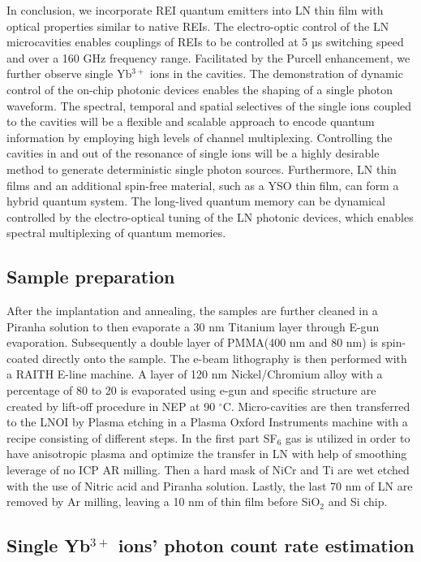 \documentclass[prl,reprint,superscriptaddress]{revtex4-1}
\begin{document}
In conclusion, we incorporate REI quantum emitters into LN thin film with optical properties similar to native REIs. The electro-optic control of the LN microcavities enables couplings of REIs to be controlled at 5 µs switching speed and over a 160 GHz  frequency range. Facilitated by the Purcell enhancement, we further observe single Yb$\mathrm{^{3+}}$ ions in the cavities. The demonstration of dynamic control of the on-chip photonic devices enables the shaping of a single photon waveform. The spectral, temporal and spatial selectives of the single ions coupled to the cavities will be a flexible and scalable approach to encode quantum information by employing high levels of channel multiplexing. Controlling the cavities in  and out of the resonance of single ions will be a highly desirable method to generate deterministic single photon sources. Furthermore, LN thin films and an additional spin-free material, such as a YSO thin film, can form a hybrid quantum system. The long-lived quantum memory can be dynamical controlled by the electro-optical tuning of the LN photonic devices, which enables  spectral multiplexing of quantum memories.  


\subsection{Sample preparation}
After the implantation and annealing, the samples are further cleaned in a Piranha solution to then evaporate a 30 nm Titanium layer through E-gun evaporation. Subsequently a double layer of PMMA(400 nm and 80 nm) is spin-coated directly onto the sample. The e-beam lithography is then performed with a RAITH E-line machine. A layer of 120 nm Nickel/Chromium alloy with a percentage of 80 to 20 is evaporated using e-gun and specific structure are created by lift-off procedure in NEP at 90 $^{\circ}$C. Micro-cavities are then transferred to the LNOI by Plasma etching in a Plasma Oxford Instruments machine with a recipe consisting of different steps. In the first part SF$_6$ gas is utilized in order to have anisotropic plasma and optimize the transfer in LN with help of smoothing leverage of no ICP AR milling. Then a hard mask of NiCr and Ti are wet etched with the use of Nitric acid and Piranha solution. Lastly, the last 70 nm of LN are removed by Ar milling, leaving a 10 nm of thin film before SiO$_2$ and Si chip.

\subsection{Single Yb$^{3+}$ ions’ photon count rate estimation}
\end{document}

